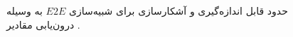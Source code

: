 \begin{itemize}
\begin{figure}[H]
		\caption{حدود قابل اندازه‌گیری و آشکارسازی برای شبیه‌سازی 
			$E2E$
			به وسیله درون‌یابی مقادیر 
			.}
		\label{fig:nsyE2E_pv}
	\end{figure}
	
	
	
\end{itemize}

